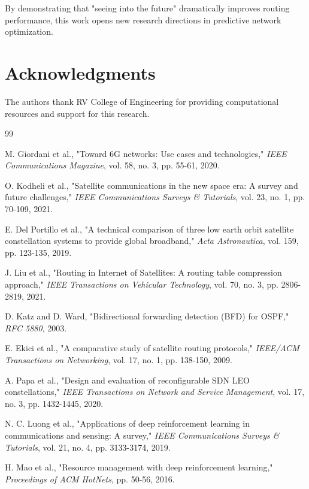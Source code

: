 By demonstrating that "seeing into the future" dramatically improves routing performance, this work opens new research directions in predictive network optimization.

\section*{Acknowledgments}

The authors thank RV College of Engineering for providing computational resources and support for this research.

\begin{thebibliography}{99}

M. Giordani et al., "Toward 6G networks: Use cases and technologies," \textit{IEEE Communications Magazine}, vol. 58, no. 3, pp. 55-61, 2020.

O. Kodheli et al., "Satellite communications in the new space era: A survey and future challenges," \textit{IEEE Communications Surveys \& Tutorials}, vol. 23, no. 1, pp. 70-109, 2021.

E. Del Portillo et al., "A technical comparison of three low earth orbit satellite constellation systems to provide global broadband," \textit{Acta Astronautica}, vol. 159, pp. 123-135, 2019.

J. Liu et al., "Routing in Internet of Satellites: A routing table compression approach," \textit{IEEE Transactions on Vehicular Technology}, vol. 70, no. 3, pp. 2806-2819, 2021.

D. Katz and D. Ward, "Bidirectional forwarding detection (BFD) for OSPF," \textit{RFC 5880}, 2003.

E. Ekici et al., "A comparative study of satellite routing protocols," \textit{IEEE/ACM Transactions on Networking}, vol. 17, no. 1, pp. 138-150, 2009.

A. Papa et al., "Design and evaluation of reconfigurable SDN LEO constellations," \textit{IEEE Transactions on Network and Service Management}, vol. 17, no. 3, pp. 1432-1445, 2020.

N. C. Luong et al., "Applications of deep reinforcement learning in communications and sensing: A survey," \textit{IEEE Communications Surveys \& Tutorials}, vol. 21, no. 4, pp. 3133-3174, 2019.

H. Mao et al., "Resource management with deep reinforcement learning," \textit{Proceedings of ACM HotNets}, pp. 50-56, 2016.


\end{thebibliography}
